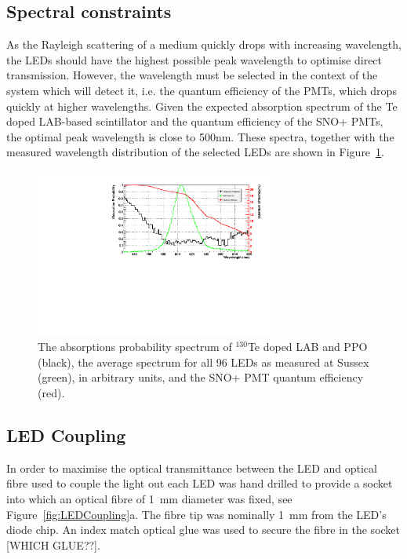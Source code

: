 \documentclass[12pt]{report}
\begin{document}
\subsection{Spectral constraints}
As the Rayleigh scattering of a medium quickly drops with increasing wavelength, the LEDs should have the highest possible peak wavelength to optimise direct transmission. However, the wavelength must be selected in the context of the system which will detect it, i.e. the quantum efficiency of the PMTs, which drops quickly at higher wavelengths. Given the expected absorption spectrum of the Te doped LAB-based scintillator and the quantum efficiency of the SNO+ PMTs, the optimal peak wavelength is close to 500nm. These spectra, together with the measured wavelength distribution of the selected LEDs are shown in Figure~\ref{fig:LEDWavelength}.

\begin{figure}[htbp]
	\begin{center}
		\includegraphics[width=0.7\textwidth]{LEDWavelength}
		\caption{The absorptions probability spectrum of $^{130}$Te doped LAB and PPO (black), the average spectrum for all 96 LEDs as measured at Sussex (green), in arbitrary units, and the SNO+ PMT quantum efficiency (red).}
		\label{fig:LEDWavelength}
	\end{center}
\end{figure}

\subsection{LED Coupling}
\label{subsec:LEDCoupling}
In order to maximise the optical transmittance between the LED and optical fibre used to couple the light out each LED was hand drilled to provide a socket into which an optical fibre of 1~mm diameter was fixed, see Figure~\ref{fig:LEDCoupling}a. The fibre tip was nominally 1~mm from the LED's diode chip. An index match optical glue was used to secure the fibre in the socket [WHICH GLUE??].
\end{document}
